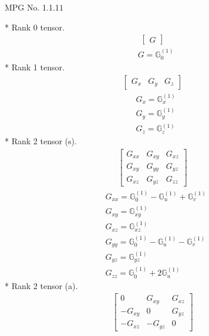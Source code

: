 \documentclass[fleqn,8pt,landscape]{jsarticle}
\begin{document}
\setcounter{MaxMatrixCols}{32}

\renewcommand{\tablename}{Table~}
\renewcommand{\figurename}{Figure~}
\begin{center}
\LARGE
MPG No. 1.1.1\quad$1$
\end{center}
* Rank 0 tensor.
\begin{align*}
\begin{bmatrix} G \end{bmatrix}
\end{align*}
\begin{align*}
& G = \mathbb{G}_{0}^{(1)}
\end{align*}
* Rank 1 tensor.
\begin{align*}
\begin{bmatrix} G_{x} & G_{y} & G_{z} \end{bmatrix}
\end{align*}
\begin{align*}
& G_{x} = \mathbb{G}_{x}^{(1)} \\
& G_{y} = \mathbb{G}_{y}^{(1)} \\
& G_{z} = \mathbb{G}_{z}^{(1)}
\end{align*}
* Rank 2 tensor (s).
\begin{align*}
\begin{bmatrix} G_{xx} & G_{xy} & G_{xz} \\ G_{xy} & G_{yy} & G_{yz} \\ G_{xz} & G_{yz} & G_{zz} \end{bmatrix}
\end{align*}
\begin{align*}
& G_{xx} = \mathbb{G}_{0}^{(1)} - \mathbb{G}_{u}^{(1)} + \mathbb{G}_{v}^{(1)} \\
& G_{xy} = \mathbb{G}_{xy}^{(1)} \\
& G_{xz} = \mathbb{G}_{xz}^{(1)} \\
& G_{yy} = \mathbb{G}_{0}^{(1)} - \mathbb{G}_{u}^{(1)} - \mathbb{G}_{v}^{(1)} \\
& G_{yz} = \mathbb{G}_{yz}^{(1)} \\
& G_{zz} = \mathbb{G}_{0}^{(1)} + 2 \mathbb{G}_{u}^{(1)}
\end{align*}
* Rank 2 tensor (a).
\begin{align*}
\begin{bmatrix} 0 & G_{xy} & G_{xz} \\ - G_{xy} & 0 & G_{yz} \\ - G_{xz} & - G_{yz} & 0 \end{bmatrix}
\end{align*}
\end{document}
